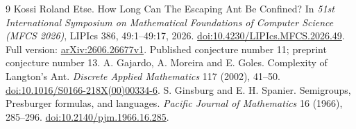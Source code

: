 \documentclass[11pt]{article}
\theoremstyle{definition}\newtheorem{definition}[theorem]{Definition}
\begin{document}
\begin{thebibliography}{9}
Kossi Roland Etse.
\newblock How Long Can The Escaping Ant Be Confined?
\newblock In \emph{51st International Symposium on Mathematical Foundations of
Computer Science (MFCS 2026)}, LIPIcs 386, 49:1--49:17, 2026.
\newblock \href{https://doi.org/10.4230/LIPIcs.MFCS.2026.49}{doi:10.4230/LIPIcs.MFCS.2026.49}.
\newblock Full version: \href{https://arxiv.org/abs/2606.26677}{arXiv:2606.26677v1}.
Published conjecture number 11; preprint conjecture number 13.
 A. Gajardo, A. Moreira and E. Goles.
Complexity of Langton's Ant. \emph{Discrete Applied Mathematics} 117 (2002),
41--50. \href{https://doi.org/10.1016/S0166-218X(00)00334-6}{doi:10.1016/S0166-218X(00)00334-6}.
 S. Ginsburg and E. H. Spanier. Semigroups, Presburger formulas,
and languages. \emph{Pacific Journal of Mathematics} 16 (1966), 285--296.
\href{https://doi.org/10.2140/pjm.1966.16.285}{doi:10.2140/pjm.1966.16.285}.
\end{thebibliography}
\end{document}
